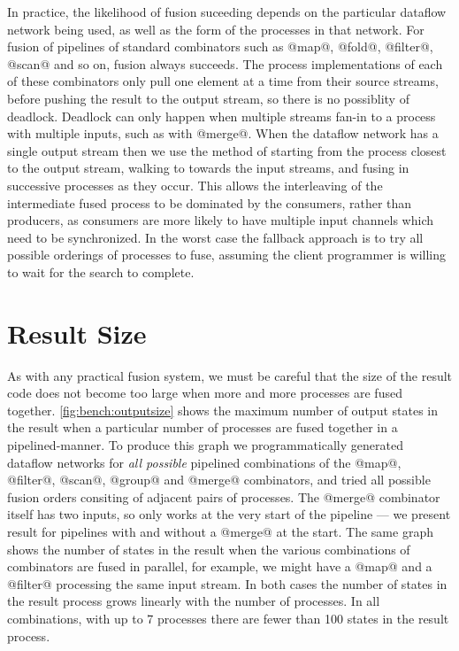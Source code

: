 In practice, the likelihood of fusion suceeding depends on the particular dataflow network being used, as well as the form of the processes in that network.
For fusion of pipelines of standard combinators such as @map@, @fold@, @filter@, @scan@ and so on, fusion always succeeds.
The process implementations of each of these combinators only pull one element at a time from their source streams, before pushing the result to the output stream, so there is no possiblity of deadlock.
Deadlock can only happen when multiple streams fan-in to a process with multiple inputs, such as with @merge@.
When the dataflow network has a single output stream then we use the method of starting from the process closest to the output stream, walking to towards the input streams, and fusing in successive processes as they occur.
This allows the interleaving of the intermediate fused process to be dominated by the consumers, rather than producers, as consumers are more likely to have multiple input channels which need to be synchronized.
In the worst case the fallback approach is to try all possible orderings of processes to fuse, assuming the client programmer is willing to wait for the search to complete. 


\section{Result Size}

As with any practical fusion system, we must be careful that the size of the result code does not become too large when more and more processes are fused together.
\autoref{fig:bench:outputsize} shows the maximum number of output states in the result when a particular number of processes are fused together in a pipelined-manner.
To produce this graph we programmatically generated dataflow networks for \emph{all possible} pipelined combinations of the @map@, @filter@, @scan@, @group@ and @merge@ combinators, and tried all possible fusion orders consiting of adjacent pairs of processes.
The @merge@ combinator itself has two inputs, so only works at the very start of the pipeline --- we present result for pipelines with and without a @merge@ at the start.
The same graph shows the number of states in the result when the various combinations of combinators are fused in parallel, for example, we might have a @map@ and a @filter@ processing the same input stream.
In both cases the number of states in the result process grows linearly with the number of processes. In all combinations, with up to 7 processes there are fewer than 100 states in the result process. 

